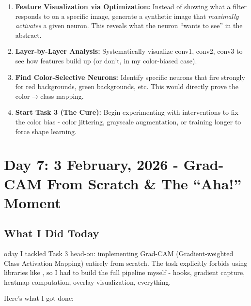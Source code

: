 \documentclass[9pt,a4paper,twocolumn,twoside]{tau-class/tau}
\begin{document}
        \begin{enumerate}
            \item \textbf{Feature Visualization via Optimization:} Instead of showing what a filter responds to on a specific image, generate a synthetic image that \textit{maximally activates} a given neuron. This reveals what the neuron ``wants to see'' in the abstract.

            \item \textbf{Layer-by-Layer Analysis:} Systematically visualize conv1, conv2, conv3 to see how features build up (or don't, in my color-biased case).

            \item \textbf{Find Color-Selective Neurons:} Identify specific neurons that fire strongly for red backgrounds, green backgrounds, etc. This would directly prove the color$\rightarrow$class mapping.

            \item \textbf{Start Task 3 (The Cure):} Begin experimenting with interventions to fix the color bias - color jittering, grayscale augmentation, or training longer to force shape learning.
        \end{enumerate}


\section{Day 7: 3 February, 2026 - Grad-CAM From Scratch \& The ``Aha!'' Moment}

    \subsection{What I Did Today}

        oday I tackled Task 3 head-on: implementing Grad-CAM (Gradient-weighted Class Activation Mapping) entirely from scratch. The task explicitly forbids using libraries like , so I had to build the full pipeline myself - hooks, gradient capture, heatmap computation, overlay visualization, everything.

        Here's what I got done:
\end{document}
